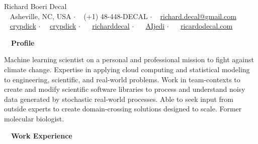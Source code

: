 \documentclass[a4paper,12pt]{article}
\newcommand{\resheading}[1]{{\hspace{-9pt} \colorbox{mygrey}{\begin{minipage}{\textwidth}{\textmd{~~\large \textbf{#1} \vphantom{p\^{E}}}}\end{minipage}}\vspace{6pt}} }
\begin{document}
\begin{center}
{\Huge Richard Boeri Decal} \\
{\small \faMapMarker~ Asheville, NC, USA $\cdot$ \faPhone~ (+1) 48-448-DECAL $\cdot$ \faEnvelope~ \href{mailto:richard.decal@gmail.com}{richard.decal@gmail.com}  \\ \faGithubAlt~ \href{https://github.com/crypdick}{crypdick} $\cdot$~\faStackOverflow~  \href{https://stackoverflow.com/users/4212158/crypdick}{crypdick} $\cdot$ ~\faLinkedin~ \href{https://www.linkedin.com/in/richarddecal/}{richarddecal}  $\cdot$ ~\faTwitter~ \href{https://twitter.com/AIjedi}{AIjedi}  $\cdot$ ~\faHome~  \href{http://www.ricardodecal.com}{ricardodecal.com}}
\end{center}

\resheading{Profile}

Machine learning scientist on a personal and professional mission to fight against climate change. Expertise in applying cloud computing and statistical modeling to engineering, scientific, and real-world problems. Work in team-contexts to create and modify scientific software libraries to process and understand noisy data generated by stochastic real-world processes. Able to seek input from outside experts to create domain-crossing solutions designed to scale. Former molecular biologist.\\

\resheading{Work Experience}

% 
% 
\end{document}
